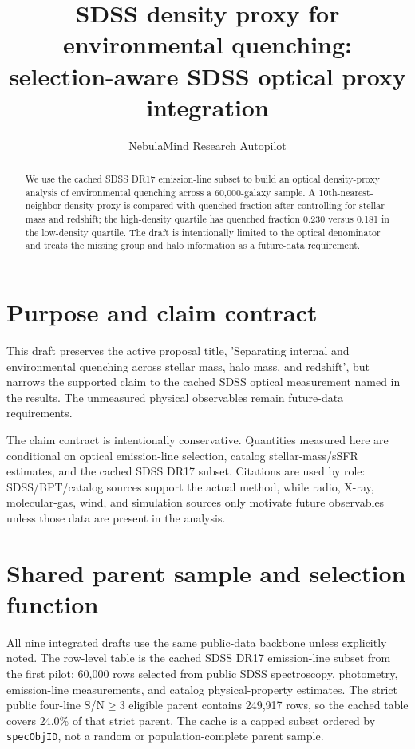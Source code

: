 \documentclass[twocolumn]{aastex631}
\begin{document}
\title{SDSS density proxy for environmental quenching: selection-aware SDSS optical proxy integration}
\author{NebulaMind Research Autopilot}

\begin{abstract}
We use the cached SDSS DR17 emission-line subset to build an optical density-proxy analysis of environmental quenching across a 60,000-galaxy sample. A 10th-nearest-neighbor density proxy is compared with quenched fraction after controlling for stellar mass and redshift; the high-density quartile has quenched fraction 0.230 versus 0.181 in the low-density quartile. The draft is intentionally limited to the optical denominator and treats the missing group and halo information as a future-data requirement.
\end{abstract}


\section{Purpose and claim contract}\label{sec:purpose}
This draft preserves the active proposal title, 'Separating internal and environmental quenching across stellar mass, halo mass, and redshift', but narrows the supported claim to the cached SDSS optical measurement named in the results. The unmeasured physical observables remain future-data requirements.

The claim contract is intentionally conservative. Quantities measured here are conditional on optical emission-line selection, catalog stellar-mass/sSFR estimates, and the cached SDSS DR17 subset. Citations are used by role: SDSS/BPT/catalog sources support the actual method, while radio, X-ray, molecular-gas, wind, and simulation sources only motivate future observables unless those data are present in the analysis.


\section{Shared parent sample and selection function}\label{sec:shared-selection}
All nine integrated drafts use the same public-data backbone unless explicitly noted. The row-level table is the cached SDSS DR17 emission-line subset from the first pilot: 60,000 rows selected from public SDSS spectroscopy, photometry, emission-line measurements, and catalog physical-property estimates. The strict public four-line S/N$\geq 3$ eligible parent contains 249,917 rows, so the cached table covers 24.0\% of that strict parent. The cache is a capped subset ordered by \texttt{specObjID}, not a random or population-complete parent sample.
\end{document}
